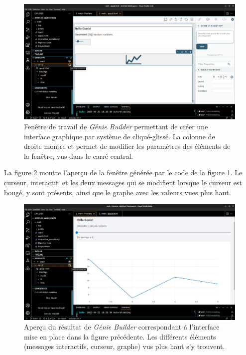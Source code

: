 \documentclass[a4paper, french, 12pt, titlepage]{article}
\begin{document}
\begin{figure}[H]
  \includegraphics[width=\linewidth]{geniebuilder_travail.png}
  \caption{Fenêtre de travail de \emph{Génie Builder} permettant de créer une interface graphique par système de \og{}cliqué-glissé\fg{}. La colonne de droite montre et permet de modifier les paramètres des éléments de la fenêtre, vus dans le carré central.}
  \label{fig:fig6}
\end{figure}

La figure \ref{fig:fig7} montre l'aperçu de la fenêtre générée par le code de la figure \ref{fig:fig6}.
Le curseur, interactif, et les deux messages qui se modifient lorsque le curseur est bougé, y sont présents, ainsi que le graphe avec les valeurs vues plus haut. 

\begin{figure}[H]
  \includegraphics[width=\linewidth]{geniebuilder_result.png}
  \caption{Aperçu du résultat de \emph{Génie Builder} correspondant à l'interface mise en place dans la figure précédente. Les différents éléments (messages interactifs, curseur, graphe) vus plus haut s'y trouvent.}
  \label{fig:fig7}
\end{figure}
\end{document}
